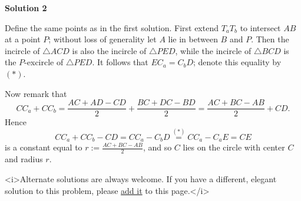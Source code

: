 \begin{enumerate}
\textbf{Solution 2}

Define the same points as in the first solution.  First extend $T_aT_b$ to intersect $AB$ at a point $P$; without loss of generality let $A$ lie in between $B$ and $P$.  Then the incircle of $\triangle ACD$ is also the incircle of $\triangle PED$, while the incircle of $\triangle BCD$ is the $P$-excircle of $\triangle PED$.  It follows that $EC_a = C_bD$; denote this equality by $(*)$.

 Now remark that
 \[CC_a + CC_b = \frac{AC+AD-CD}2 + \frac{BC+DC-BD}2 = \frac{AC+BC-AB}2 + CD.\]Hence
 \[CC_a + CC_b - CD = CC_a - C_bD \stackrel{(*)}= CC_a - C_aE = CE\]is a constant equal to $r := \frac{AC+BC-AB}2$, and so $C$ lies on the circle with center $C$ and radius $r$.

 


 <i>Alternate solutions are always welcome. If you have a different, elegant solution to this problem, please \href{https://artofproblemsolving.com/wiki/index.php?title=1991\_USAMO\_Problems/Problem\_5&action=edit}{add it} to this page.</i>



\end{enumerate}